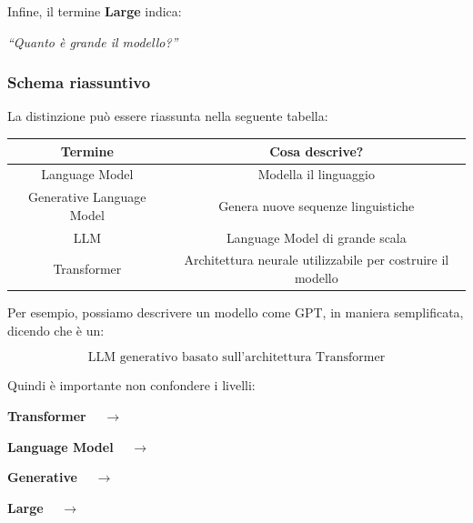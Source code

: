 Infine, il termine \textbf{Large} indica:

\begin{center}
\textit{``Quanto è grande il modello?''}
\end{center}

\subsubsection{Schema riassuntivo}

La distinzione può essere riassunta nella seguente tabella:

\begin{center}
\begin{tabular}{|c|c|}
\hline
\textbf{Termine} & \textbf{Cosa descrive?} \\
\hline
Language Model & Modella il linguaggio \\
\hline
Generative Language Model & Genera nuove sequenze linguistiche \\
\hline
LLM & Language Model di grande scala \\
\hline
Transformer & Architettura neurale utilizzabile per costruire il modello \\
\hline
\end{tabular}
\end{center}

Per esempio, possiamo descrivere un modello come GPT, in maniera semplificata, dicendo che è un:

\begin{equation}
\boxed{
\text{LLM generativo basato sull'architettura Transformer}
}
\end{equation}

Quindi è importante non confondere i livelli:

\begin{center}
\textbf{Transformer}
\(\quad\rightarrow\quad\)
\end{center}

\begin{center}
\textbf{Language Model}
\(\quad\rightarrow\quad\)
\end{center}

\begin{center}
\textbf{Generative}
\(\quad\rightarrow\quad\)
\end{center}

\begin{center}
\textbf{Large}
\(\quad\rightarrow\quad\)
\end{center}





